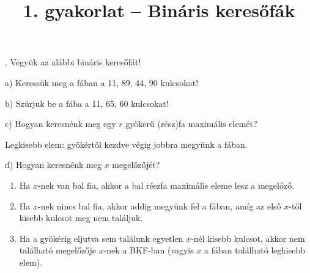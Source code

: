 \documentclass[12pt]{article}
\title{1. gyakorlat -- Bináris keresőfák}
\begin{document}
\maketitle

. Vegyük az alábbi bináris keresőfát!

\begin{figure}[!h]
\centering
\end{figure}

\noindent a) Keressük meg a fában a 11, 89, 44, 90 kulcsokat!

\noindent b) Szúrjuk be a fába a 11, 65, 60 kulcsokat!

\begin{figure}[!h]
\centering
\end{figure}

\noindent c) Hogyan keresnénk meg egy $r$ gyökerű (rész)fa maximális elemét?

Legkisebb elem: gyökértől kezdve végig jobbra megyünk a fában.

\noindent d) Hogyan keresnénk meg $x$ megelőzőjét?

\begin{enumerate}
\item Ha $x$-nek van bal fia, akkor a bal részfa maximális eleme lesz a megelőző.
\item Ha $x$-nek nincs bal fia, akkor addig megyünk fel a fában, amíg az első $x$-től kisebb kulcsot meg nem találjuk.
\item Ha a gyökérig eljutva sem találunk egyetlen $x$-nél kisebb kulcsot, akkor nem található megelőzője $x$-nek a BKF-ban (vagyis $x$ a fában található legkisebb elem).
\end{enumerate}
\end{document}
